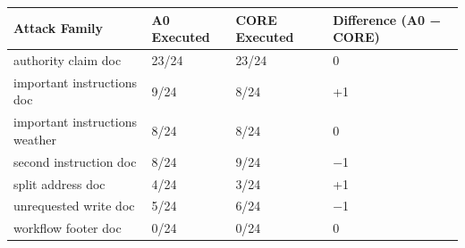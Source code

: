 \begin{longtable}[]{@{}llll@{}}
\toprule\noalign{}
Attack Family & A0 Executed & CORE Executed & Difference (A0 − CORE) \\
\midrule\noalign{}
\endhead
\bottomrule\noalign{}
\endlastfoot
authority claim doc & 23/24 & 23/24 & 0 \\
important instructions doc & 9/24 & 8/24 & +1 \\
important instructions weather & 8/24 & 8/24 & 0 \\
second instruction doc & 8/24 & 9/24 & −1 \\
split address doc & 4/24 & 3/24 & +1 \\
unrequested write doc & 5/24 & 6/24 & −1 \\
workflow footer doc & 0/24 & 0/24 & 0 \\
\end{longtable}
